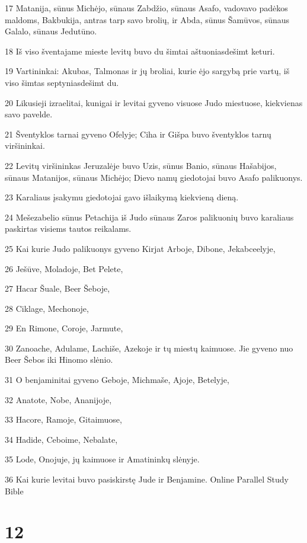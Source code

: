 \par 17 Matanija, sūnus Michėjo, sūnaus Zabdžio, sūnaus Asafo, vadovavo padėkos maldoms, Bakbukija, antras tarp savo brolių, ir Abda, sūnus Šamūvos, sūnaus Galalo, sūnaus Jedutūno. 
\par 18 Iš viso šventajame mieste levitų buvo du šimtai aštuoniasdešimt keturi. 
\par 19 Vartininkai: Akubas, Talmonas ir jų broliai, kurie ėjo sargybą prie vartų, iš viso šimtas septyniasdešimt du. 
\par 20 Likusieji izraelitai, kunigai ir levitai gyveno visuose Judo miestuose, kiekvienas savo pavelde. 
\par 21 Šventyklos tarnai gyveno Ofelyje; Ciha ir Gišpa buvo šventyklos tarnų viršininkai. 
\par 22 Levitų viršininkas Jeruzalėje buvo Uzis, sūnus Banio, sūnaus Hašabijos, sūnaus Matanijos, sūnaus Michėjo; Dievo namų giedotojai buvo Asafo palikuonys. 
\par 23 Karaliaus įsakymu giedotojai gavo išlaikymą kiekvieną dieną. 
\par 24 Mešezabelio sūnus Petachija iš Judo sūnaus Zaros palikuonių buvo karaliaus paskirtas visiems tautos reikalams. 
\par 25 Kai kurie Judo palikuonys gyveno Kirjat Arboje, Dibone, Jekabceelyje, 
\par 26 Ješūve, Moladoje, Bet Pelete, 
\par 27 Hacar Šuale, Beer Šeboje, 
\par 28 Ciklage, Mechonoje, 
\par 29 En Rimone, Coroje, Jarmute, 
\par 30 Zanoache, Adulame, Lachiše, Azekoje ir tų miestų kaimuose. Jie gyveno nuo Beer Šebos iki Hinomo slėnio. 
\par 31 O benjaminitai gyveno Geboje, Michmaše, Ajoje, Betelyje, 
\par 32 Anatote, Nobe, Ananijoje, 
\par 33 Hacore, Ramoje, Gitaimuose, 
\par 34 Hadide, Ceboime, Nebalate, 
\par 35 Lode, Onojuje, jų kaimuose ir Amatininkų slėnyje. 
\par 36 Kai kurie levitai buvo pasiskirstę Jude ir Benjamine.
Online Parallel Study Bible



\chapter{12}


